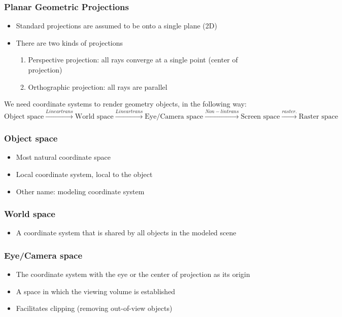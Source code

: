 \documentclass[11pt]{article}
\begin{document}
\subsubsection*{Planar Geometric Projections}
\begin{itemize}
    \item Standard projections are assumed to be onto a single plane (2D)
    \item There are two kinds of projections \begin{enumerate}
        \item Perspective projection: all rays converge at a single point (center of projection)
        \item Orthographic projection: all rays are parallel
    \end{enumerate}
\end{itemize}

\noindent We need coordinate systems to render geometry objects, in the following way:
\newline
$
\text{Object space} \stackrel{Linear trans}{\to} \text{World space} \stackrel{Linear trans}{\to} \text{Eye/Camera space} \stackrel{Non-lin trans}{\to} \text{Screen space} \stackrel{raster.}{\to} \text{Raster space} $

\subsubsection*{Object space}
\begin{itemize}
    \item Most natural coordinate space
    \item Local coordinate system, local to the object
    \item Other name: modeling coordinate system
\end{itemize}

\subsubsection*{World space}
\begin{itemize}
    \item A coordinate system that is shared by all objects in the modeled scene
\end{itemize}

\subsubsection*{Eye/Camera space}
\begin{itemize}
    \item The coordinate system with the eye or the center of projection as its origin
    \item A space in which the viewing volume is established
    \item Facilitates clipping (removing out-of-view objects)
\end{itemize}
\end{document}
